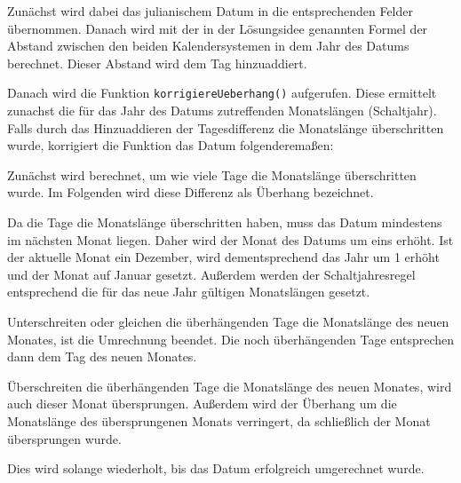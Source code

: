 	Zunächst wird dabei das julianischem Datum in die entsprechenden Felder übernommen. Danach wird mit der in der Lösungsidee genannten Formel der Abstand zwischen den beiden Kalendersystemen in dem Jahr des Datums berechnet. Dieser Abstand wird dem Tag hinzuaddiert. 

	Danach wird die Funktion \texttt{korrigiereUeberhang()} aufgerufen. Diese ermittelt zunachst die für das Jahr des Datums zutreffenden Monatslängen (Schaltjahr). Falls durch das Hinzuaddieren der Tagesdifferenz die Monatslänge überschritten wurde, korrigiert die Funktion das Datum folgenderemaßen:

	Zunächst wird berechnet, um wie viele Tage die Monatslänge überschritten wurde. Im Folgenden wird diese Differenz als Überhang bezeichnet.

	Da die Tage die Monatslänge überschritten haben, muss das Datum mindestens im nächsten Monat liegen. Daher wird der Monat des Datums um eins erhöht. Ist der aktuelle Monat ein Dezember, wird dementsprechend das Jahr um 1 erhöht und der Monat auf Januar gesetzt. Außerdem werden der Schaltjahresregel entsprechend die für das neue Jahr gültigen Monatslängen gesetzt.

	Unterschreiten oder gleichen die überhängenden Tage die Monatslänge des neuen Monates, ist die Umrechnung beendet. Die noch überhängenden Tage entsprechen dann dem Tag des neuen Monates.

	Überschreiten die überhängenden Tage die Monatslänge des neuen Monates, wird auch dieser Monat übersprungen. Außerdem wird der Überhang um die Monatslänge des übersprungenen Monats verringert, da schließlich der Monat übersprungen wurde.

	Dies wird solange wiederholt, bis das Datum erfolgreich umgerechnet wurde.